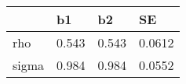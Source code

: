 \begin{tabular}{llll}
\hline 
  & b1 & b2 & SE \\ 
\hline 
rho & 0.543 & 0.543 & 0.0612 \\ 
sigma & 0.984 & 0.984 & 0.0552 \\ 
\hline 
\end{tabular}
